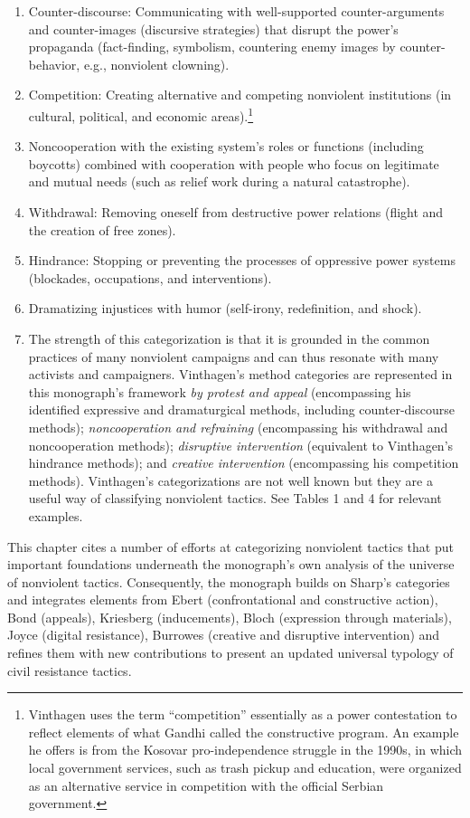 \documentclass[twoside,a4paper,12pt,fleqn,openany]{extbook}
\begin{document}
\begin{enumerate}
\item Counter-discourse: Communicating with well-supported counter-arguments and counter-images (discursive strategies) that disrupt the power’s propaganda (fact-finding, symbolism, countering enemy images by counter-behavior, e.g., nonviolent clowning).
\item Competition: Creating alternative and competing nonviolent institutions (in cultural, political, and economic areas).\footnote{Vinthagen uses the term “competition” essentially as a power contestation to reflect elements of what Gandhi called the constructive program. An example he offers is from the Kosovar pro-independence struggle in the 1990s, in which local government services, such as trash pickup and education, were organized as an alternative service in competition with the official Serbian government.}
\item Noncooperation with the existing system’s roles or functions (including boycotts) combined with cooperation with people who focus on legitimate and mutual needs (such as relief work during a natural catastrophe).
\item Withdrawal: Removing oneself from destructive power relations (flight and the creation of free zones).
\item Hindrance: Stopping or preventing the processes of oppressive power systems (blockades, occupations, and interventions).
\item Dramatizing injustices with humor (self-irony, redefinition, and shock).
\item The strength of this categorization is that it is grounded in the common practices of many nonviolent campaigns and can thus resonate with many activists and campaigners. Vinthagen’s method categories are represented in this monograph’s framework \emph{by protest and appeal} (encompassing his identified expressive and dramaturgical methods, including counter-discourse methods); \emph{noncooperation and refraining} (encompassing his withdrawal and noncooperation methods); \emph{disruptive intervention} (equivalent to Vinthagen’s hindrance methods); and \emph{creative intervention} (encompassing his competition methods). Vinthagen’s categorizations are not well known but they are a useful way of classifying nonviolent tactics. See Tables 1 and 4 for
relevant examples.
\end{enumerate}

This chapter cites a number of efforts at categorizing nonviolent tactics that put important foundations underneath the monograph’s own analysis of the universe of nonviolent tactics. Consequently, the monograph builds on Sharp’s categories and integrates elements from Ebert (confrontational and constructive action), Bond (appeals), Kriesberg (inducements), Bloch (expression through materials), Joyce (digital resistance), Burrowes (creative and disruptive intervention) and refines them with new contributions to present an updated universal typology of civil resistance tactics.
\end{document}
